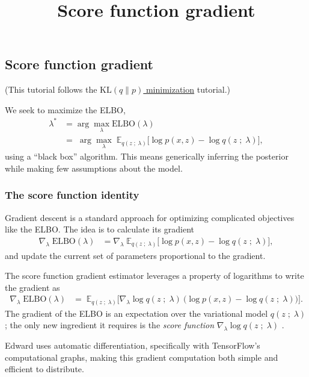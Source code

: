 \title{Score function gradient}

\subsection{Score function gradient}

(This tutorial follows the
\href{klqp}{$\text{KL}(q\|p)$ minimization} tutorial.)

We seek to maximize the ELBO,
\begin{align*}
  \lambda^*
  &=
  \arg \max_\lambda \text{ELBO}(\lambda)\\
  &=\;
  \arg \max_\lambda\;
  \mathbb{E}_{q(z\;;\;\lambda)}
  \big[
  \log p(x, z)
  -
  \log q(z\;;\;\lambda)
  \big],
\end{align*}
using a ``black box'' algorithm. This means generically inferring the
posterior while making few assumptions about the model.

\subsubsection{The score function identity}

Gradient descent is a standard approach for optimizing complicated
objectives like the ELBO. The idea is to calculate its gradient
\begin{align*}
  \nabla_\lambda\;
  \text{ELBO}(\lambda)
  &=
  \nabla_\lambda\;
  \mathbb{E}_{q(z\;;\;\lambda)}
  \big[
  \log p(x, z)
  -
  \log q(z\;;\;\lambda)
  \big],
\end{align*}
and update the current set of parameters proportional to the gradient.

The score function gradient estimator leverages a property of
logarithms to write the gradient as
\begin{align*}
  \nabla_\lambda\;
  \text{ELBO}(\lambda)
  &=\;
  \mathbb{E}_{q(z\;;\;\lambda)}
  \big[
  \nabla_\lambda \log q(z\;;\;\lambda)
  \:
  \big(
  \log p(x, z)
  -
  \log q(z\;;\;\lambda)
  \big)
  \big].
\end{align*}
The gradient of the ELBO is an expectation over the variational
model $q(z\;;\;\lambda)$; the only new ingredient it requires is the
\emph{score function} $\nabla_\lambda \log q(z\;;\;\lambda)$
\citep{paisley2012variational,ranganath2014black}.

Edward uses automatic differentiation, specifically with TensorFlow's
computational graphs, making this gradient computation both simple and
efficient to distribute.

